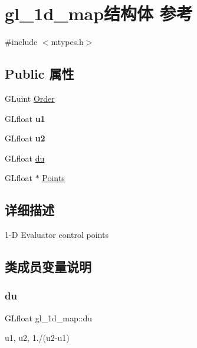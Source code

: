 \hypertarget{structgl__1d__map}{}\section{gl\+\_\+1d\+\_\+map结构体 参考}
\label{structgl__1d__map}


{\ttfamily \#include $<$mtypes.\+h$>$}

\subsection*{Public 属性}
\begin{DoxyCompactItemize}
\item 
G\+Luint \hyperlink{structgl__1d__map_ad7b7cf78f346398948d409ae6fda9d16}{Order}
\item 
\mbox{\label{structgl__1d__map_aea207eef3f89bc6ca40d58a8f8f2e425}} 
G\+Lfloat {\bfseries u1}
\item 
\mbox{\label{structgl__1d__map_acc684b122fc91b9e8ea597289ed9aab0}} 
G\+Lfloat {\bfseries u2}
\item 
G\+Lfloat \hyperlink{structgl__1d__map_a22bcc06e4800fc7430dc6432aff911d2}{du}
\item 
G\+Lfloat $\ast$ \hyperlink{structgl__1d__map_a21d455a5a0745a31ed781e0a336bd6a0}{Points}
\end{DoxyCompactItemize}


\subsection{详细描述}
1-\/D Evaluator control points 

\subsection{类成员变量说明}
\mbox{\label{structgl__1d__map_a22bcc06e4800fc7430dc6432aff911d2}} 
\subsubsection{\texorpdfstring{du}{du}}
{\footnotesize\ttfamily G\+Lfloat gl\+\_\+1d\+\_\+map\+::du}

u1, u2, 1./(u2-\/u1) \mbox{\label{structgl__1d__map_ad7b7cf78f346398948d409ae6fda9d16}} 
